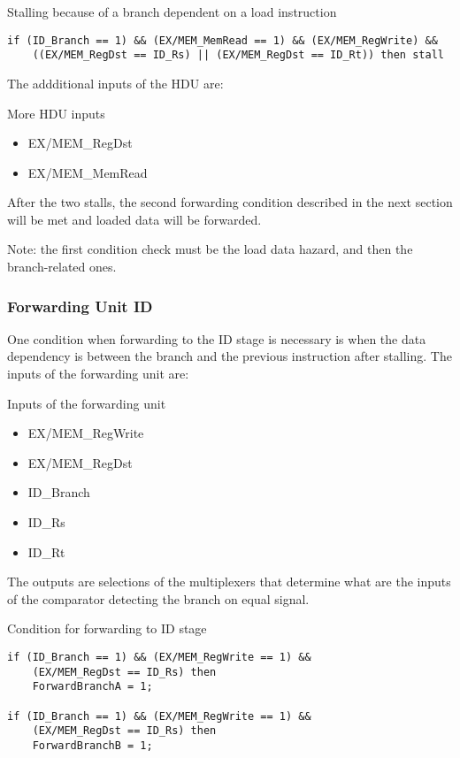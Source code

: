 \documentclass[a4paper,12pt]{report}
\begin{document}
\begin{my-listing}{Stalling because of a branch dependent on a load instruction}
\begin{lstlisting}[style=vhdl]
if (ID_Branch == 1) && (EX/MEM_MemRead == 1) && (EX/MEM_RegWrite) &&
    ((EX/MEM_RegDst == ID_Rs) || (EX/MEM_RegDst == ID_Rt)) then stall
\end{lstlisting}
\end{my-listing}

The addditional inputs of the HDU are:
\begin{my-list}{More HDU inputs}
\begin{itemize}
    \item EX/MEM\_RegDst
    \item EX/MEM\_MemRead
\end{itemize}
\end{my-list}

After the two stalls, the second forwarding condition described in the next section will be met and loaded data will be forwarded.

Note: the first condition check must be the load data hazard, and then the branch-related ones.

\subsubsection{Forwarding Unit ID}
One condition when forwarding to the ID stage is necessary is when the data dependency is between the branch and the previous instruction after stalling.
The inputs of the forwarding unit are:

\begin{my-list}{Inputs of the forwarding unit}
    \begin{itemize}
        \item EX/MEM\_RegWrite
        \item EX/MEM\_RegDst
        \item ID\_Branch
        \item ID\_Rs
        \item ID\_Rt
    \end{itemize}
\end{my-list}

The outputs are selections of the multiplexers that determine what are the inputs of the comparator detecting the branch on equal signal.

\begin{my-listing}{Condition for forwarding to ID stage}
    \begin{lstlisting}[style=vhdl]
if (ID_Branch == 1) && (EX/MEM_RegWrite == 1) &&
    (EX/MEM_RegDst == ID_Rs) then
    ForwardBranchA = 1;

if (ID_Branch == 1) && (EX/MEM_RegWrite == 1) &&
    (EX/MEM_RegDst == ID_Rs) then
    ForwardBranchB = 1;
    \end{lstlisting}
\end{my-listing}
\end{document}
